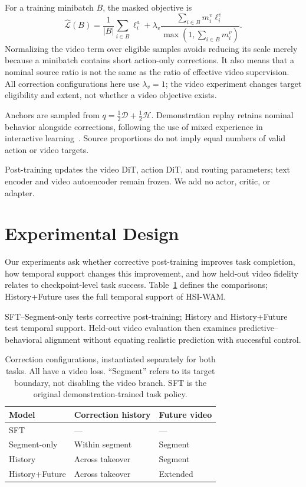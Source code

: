 \documentclass[letterpaper,10pt,conference]{ieeeconf}
\begin{document}
For a training minibatch $B$, the masked objective is
\begin{equation}
 \widehat{\mathcal L}(B)=
 \frac{1}{|B|}\sum_{i\in B}\ell_i^a+
 \lambda_v\frac{\sum_{i\in B}m_i^v\ell_i^v}
 {\max(1,\sum_{i\in B}m_i^v)}.
 \label{eq:loss}
\end{equation}
Normalizing the video term over eligible samples avoids reducing its scale merely because a minibatch contains short action-only corrections. It also means that a nominal source ratio is not the same as the ratio of effective video supervision. All correction configurations here use $\lambda_v=1$; the video experiment changes target eligibility and extent, not whether a video objective exists.

Anchors are sampled from $q=\tfrac12\mathcal D+\tfrac12\mathcal H$. Demonstration replay retains nominal behavior alongside corrections, following the use of mixed experience in interactive learning~\cite{iwr,sirius}. Source proportions do not imply equal numbers of valid action or video targets.

Post-training updates the video DiT, action DiT, and routing parameters; text encoder and video autoencoder remain frozen. We add no actor, critic, or adapter.

\section{Experimental Design}
Our experiments ask whether corrective post-training improves task completion, how temporal support changes this improvement, and how held-out video fidelity relates to checkpoint-level task success. Table~\ref{tab:configs} defines the comparisons; History+Future uses the full temporal support of HSI-WAM.

SFT--Segment-only tests corrective post-training; History and History+Future test temporal support. Held-out video evaluation then examines predictive--behavioral alignment without equating realistic prediction with successful control.

\begin{table}[t]
\centering\small
\caption{Correction configurations, instantiated separately for both tasks. All have a video loss. ``Segment'' refers to its target boundary, not disabling the video branch. SFT is the original demonstration-trained task policy.}
\label{tab:configs}
\begin{tabular}{lll}
\toprule
Model & Correction history & Future video \\
\midrule
SFT & --- & --- \\
Segment-only & Within segment & Segment \\
History & Across takeover & Segment \\
History+Future & Across takeover & Extended \\
\bottomrule
\end{tabular}
\end{table}
\end{document}
